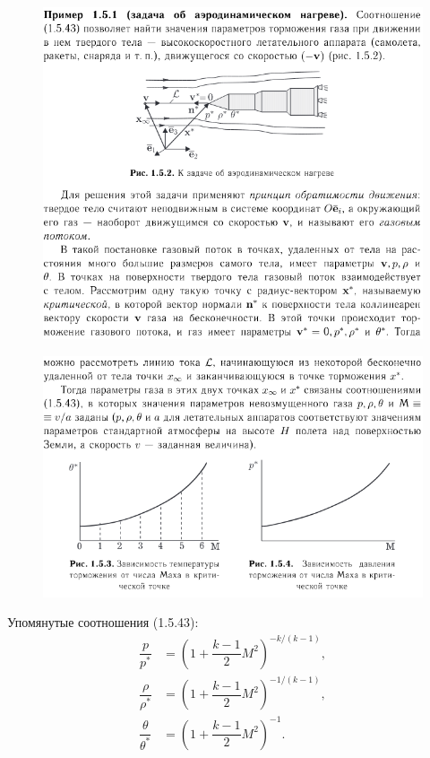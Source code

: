 
\begin{figure}[H]
  \centering
  \includegraphics[width=0.7\linewidth]{img/50_01.png}
\end{figure}
\begin{figure}[H]
  \centering
  \includegraphics[width=0.7\linewidth]{img/50_02.png}
\end{figure}

Упомянутые соотношения (1.5.43):
\begin{align*}
  \dfrac{p}{p^*} &= \left( 1 + \dfrac{k-1}{2} M^2 \right)^{- k / (k-1)}, \\
  \dfrac{\rho}{\rho^*} &= \left( 1 + \dfrac{k-1}{2} M^2 \right)^{-1 / (k-1)}, \\
  \dfrac{\theta}{\theta^*} &= \left( 1 + \dfrac{k-1}{2} M^2 \right)^{-1}.
\end{align*}
